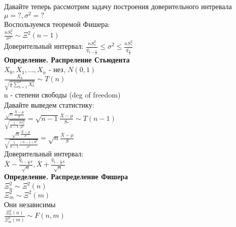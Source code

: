 \documentclass{article}
\newcommand\0{\mathbb{0}}
\newcommand\1{\mathbb{1}}
\begin{document}
Давайте теперь рассмотрим задачу построения доверительного интревала $\mu = ?, \sigma^2 = ?$\\
Воспользуемся теоремой Фишера:\\
$\frac{n S_*^2}{\sigma^2} \sim \Xi^2(n - 1)$\\
Доверительный интервал: $\frac{n S_*^2}{q_{1 - \frac{\alpha}{2}}} \leq \sigma^2 \leq \frac{n S_*^2}{q_{\frac{\alpha}{2}}}$\\
\textbf{Определение. Распреление Стьюдента}\\
$X_0, X_1, \dots, X_n$ - нез, $N(0, 1)$\\
$\frac{X_0}{\sqrt{\frac{1}{n}\displaystyle\sum_{k = 1}^n X_k^2}} \sim T(n)$\\
n - степени свободы (deg of freedom)\\
Давайте выведем статистику:\\
$\frac{\sqrt{n}\frac{\overline{X} - \mu}{\sigma}}{\sqrt{\frac{1}{n - 1}\frac{n s_*^2}{\sigma^2}}} = \sqrt{n - 1}\frac{\overline{X} - \mu}{S_*} \sim T(n - 1)$\\
$\frac{\sqrt{n}\frac{\overline{X} - \mu}{\sigma}}{\sqrt{\frac{1}{n - 1} \frac{(n - 1)S^2}{\sigma^2}}} = \sqrt{n}\frac{\overline{X} - \mu}{S}$\\
Доверительный интервал:\\
$\overline{X} - \frac{q_{1 - \frac{\alpha}{2}S}}{\sqrt{n}}, \overline{X} + \frac{q_{1 - \frac{\alpha}{2}S}}{\sqrt{n}}$\\
\textbf{Определение. Распределение Фишера}\\
$\Xi_n^2 \sim \Xi^2(n)$\\
$\Xi_m^2 \sim \Xi^2(m)$\\
Они независимы\\
$\frac{\Xi_n^2(n)}{\Xi_m^2(m)} \sim F(n, m)$
\end{document}
